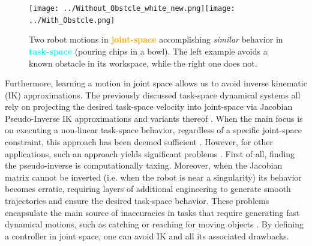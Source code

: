 \documentclass[letterpaper, 10 pt, conference,fleqn]{ieeeconf}
\begin{document}
\begin{figure}[t]
\centering
\texttt{[image: ../Without\_Obstcle\_white\_new.png]}\texttt{[image: ../With\_Obstcle.png]}
\caption{Two robot motions in \textcolor{orange}{\textbf{joint-space}} accomplishing \textit{similar} behavior in \textcolor{cyan}{\textbf{task-space}} (pouring chips in a bowl). The left example avoids a known obstacle in its workspace, while the right one does not.}
\label{fig:robot_example}
\vspace{-20pt}
\end{figure}

Furthermore, learning a motion in joint space allows us to avoid inverse kinematic (IK) approximations. The previously discussed task-space dynamical systems all rely on projecting the desired task-space velocity into joint-space via Jacobian Pseudo-Inverse IK approximations and variants thereof \cite{kelly2006control}. When the main focus is on executing a non-linear task-space behavior, regardless of a specific joint-space constraint, this approach has been deemed sufficient \cite{figueroa2016HRIrolling,ureche2015taskconst}. However, for other applications, such an approach yields significant problems \cite{buss2004introduction}. First of all, finding the pseudo-inverse is computationally taxing. Moreover, when the Jacobian matrix cannot be inverted (i.e. when the robot is near a singularity) its behavior becomes erratic, requiring layers of additional engineering to generate smooth trajectories and ensure the desired task-space behavior. These problems encapsulate the main source of inaccuracies in tasks that require generating fast dynamical motions, such as catching or reaching for moving objects \cite{7439839,Salehian-RSS-16}. By defining a controller in joint space, one can avoid IK and all its associated drawbacks.
\end{document}
